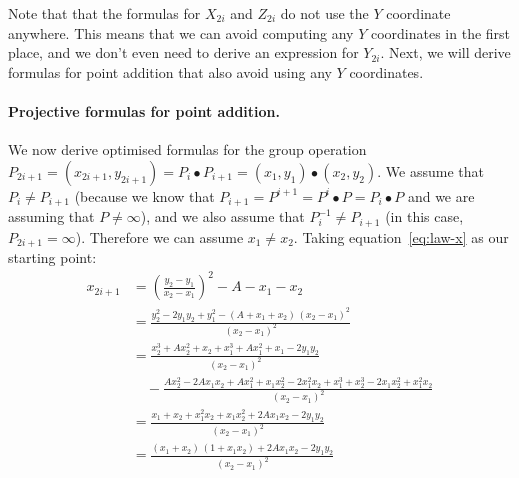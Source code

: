 \documentclass{article}
\begin{document}
Note that that the formulas for $X_{2i}$ and $Z_{2i}$ do not use the $Y$ coordinate anywhere.
This means that we can avoid computing any $Y$ coordinates in the first place, and we don't even need to derive an expression for $Y_{2i}$.
Next, we will derive formulas for point addition that also avoid using any $Y$ coordinates.

\paragraph{Projective formulas for point addition.}

We now derive optimised formulas for the group operation
$P_{2i+1} = (x_{2i+1}, y_{2i+1}) = P_i \bullet P_{i+1} = (x_1, y_1) \bullet (x_2, y_2)$.
We assume that $P_i \ne P_{i+1}$ (because we know that $P_{i+1} = P^{i+1} = P^i \bullet P = P_i \bullet P$ and we are assuming that $P \ne \infty$), and we also assume that $P_i^{-1} \ne P_{i+1}$ (in this case, $P_{2i+1} = \infty$).
Therefore we can assume $x_1 \neq x_2$.
Taking equation~\eqref{eq:law-x} as our starting point:
\begin{align}
x_{2i+1} &= \left(\frac{y_2 - y_1}{x_2 - x_1}\right)^2 - A - x_1 - x_2 \nonumber\\[5pt]
&= \frac{y_2^2 - 2y_1 y_2 + y_1^2 - (A + x_1 + x_2)\,(x_2 - x_1)^2}{(x_2 - x_1)^2} \nonumber\\[5pt]
&= \frac{x_2^3 + Ax_2^2 + x_2 + x_1^3 + Ax_1^2 + x_1 - 2y_1 y_2}{(x_2 - x_1)^2} \nonumber\\
    &\quad - \frac{Ax_2^2 - 2Ax_1 x_2 + Ax_1^2 + x_1 x_2^2 - 2 x_1^2 x_2 + x_1^3 + x_2^3 - 2x_1 x_2^2 + x_1^2 x_2}{(x_2 - x_1)^2} \nonumber\\[5pt]
&= \frac{x_1 + x_2 + x_1^2 x_2 + x_1 x_2^2 + 2A x_1 x_2 - 2y_1 y_2}{(x_2 - x_1)^2} \nonumber\\[5pt]
&= \frac{(x_1 + x_2)\,(1 + x_1 x_2) + 2A x_1 x_2 - 2y_1 y_2}{(x_2 - x_1)^2} \label{eq:add-x}
\end{align}
\end{document}
